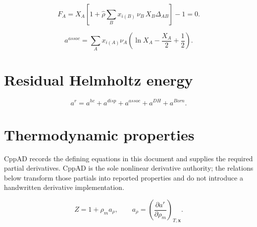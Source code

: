 \documentclass[11pt]{article}
\begin{document}
\begin{equation}
F_A=X_A\left[
1+\widehat{\rho}\sum_B x_{i(B)}\,\nu_B\,X_B\Delta_{AB}
\right]-1=0.
\label{eq:association_mass_action}
\end{equation}

\begin{equation}
a^{assoc}=\sum_A x_{i(A)}\nu_A
\left(\ln X_A-\frac{X_A}{2}+\frac{1}{2}\right).
\label{eq:association_helmholtz}
\end{equation}

\section{Residual Helmholtz energy}

\begin{equation}
a^r=a^{hc}+a^{disp}+a^{assoc}+a^{DH}+a^{Born}.
\label{eq:residual_helmholtz}
\end{equation}

\section{Thermodynamic properties}

CppAD records the defining equations in this document and supplies the
required partial derivatives. CppAD is the sole nonlinear derivative
authority; the relations below transform those partials into reported
properties and do not introduce a handwritten derivative implementation.

\begin{equation}
Z=1+\rho_m a_\rho,
\qquad
a_\rho=\left(\frac{\partial a^r}{\partial\rho_m}\right)_{T,\boldsymbol{x}}.
\label{eq:compressibility_factor}
\end{equation}
\end{document}

